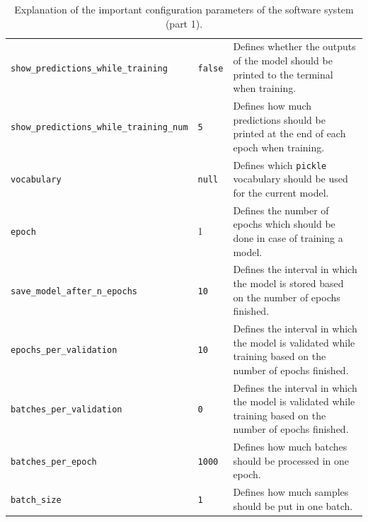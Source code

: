 \begin{table}[H]
\begin{adjustbox}{max width=\textwidth, max height=\textheight}
\begin{tabular}{llp{10cm}}
			\texttt{show{\_}predictions\_while\_training} & \texttt{false} & Defines whether the outputs of the model should be printed to the terminal when training.\\
			\texttt{show{\_}predictions\_while\_training\_num} & \texttt{5} & Defines how much predictions should be printed at the end of each epoch when training.\\
			\texttt{vocabulary} & \texttt{null} & Defines which \texttt{pickle} vocabulary should be used for the current model.\\
			\texttt{epoch} & 1 & Defines the number of epochs which should be done in case of training a model.\\
			\texttt{save\_model\_after\_n\_epochs} & \texttt{10} & Defines the interval in which the model is stored based on the number of epochs finished.\\
			\texttt{epochs\_per\_validation} & \texttt{10} & Defines the interval in which the model is validated while training based on the number of epochs finished.\\
			\texttt{batches\_per\_validation} & \texttt{0} & Defines the interval in which the model is validated while training based on the number of epochs finished.\\
			\texttt{batches\_per\_epoch} & \texttt{1000} & Defines how much batches should be processed in one epoch.\\
			\texttt{batch{\_}size} & \texttt{1} & Defines how much samples should be put in one batch.\\
			\bottomrule
		\end{tabular}
	\end{adjustbox}
	\caption{Explanation of the important configuration parameters of the software system (part 1).}
\end{table}

\clearpage

